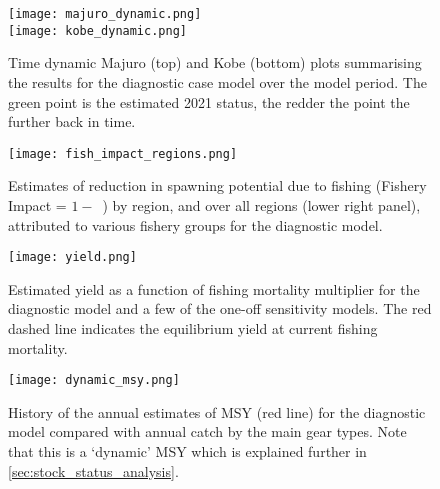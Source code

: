 \newpage
\begin{figure}[!ht]
  \centering
  \texttt{[image: majuro\_dynamic.png]}\\[3ex]
  \texttt{[image: kobe\_dynamic.png]}
  \caption{Time dynamic Majuro (top) and Kobe (bottom) plots summarising the results for the diagnostic case model over the model period. The green point is the estimated 2021 status, the redder the point the further back in time. \label{fig:dynamic_majuro_kobe}}
\end{figure}
\clearpage

\newpage
\begin{figure}[!ht]
  \centering
  \texttt{[image: fish\_impact\_regions.png]}
  \caption{Estimates of reduction in spawning potential due to fishing (Fishery Impact = \mbox{$1-$ \sbtsbfo}) by region, and over all regions (lower right panel), attributed to various fishery groups for the diagnostic model. \label{fig:fishery_impact}}
\end{figure}
\clearpage

\newpage
\begin{figure}[!ht]
  \centering
  \texttt{[image: yield.png]}
  \caption{Estimated yield as a function of fishing mortality multiplier for the diagnostic model and a few of the one-off sensitivity models. The red dashed line indicates the equilibrium yield at current fishing mortality. \label{fig:yield}}
\end{figure}
\clearpage

\newpage
\begin{figure}[!ht]
  \centering
  \texttt{[image: dynamic\_msy.png]}
  \caption{History of the annual estimates of MSY (red line) for the diagnostic model compared with annual catch by the main gear types. Note that this is a `dynamic' MSY which is explained further in \autoref{sec:stock_status_analysis}. \label{fig:dynamic_msy}}
\end{figure}
\clearpage
